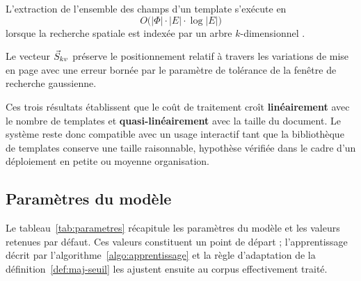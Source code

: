\begin{theoreme}
\label{th:complexite-extraction}
L'extraction de l'ensemble des champs d'un template s'exécute en
\begin{equation}
O\big(|\Phi| \cdot |E| \cdot \log |E|\big)
\end{equation}
lorsque la recherche spatiale est indexée par un arbre $k$-dimensionnel
\cite{bentley1975kdtree}.
\end{theoreme}

\begin{lemme}
\label{lem:preservation}
Le vecteur $\vec{S}_{kv}$ préserve le positionnement relatif à travers les variations de mise en
page avec une erreur bornée par le paramètre de tolérance de la fenêtre de recherche
gaussienne.
\end{lemme}

Ces trois résultats établissent que le coût de traitement croît \textbf{linéairement} avec le
nombre de templates et \textbf{quasi-linéairement} avec la taille du document. Le système
reste donc compatible avec un usage interactif tant que la bibliothèque de templates conserve
une taille raisonnable, hypothèse vérifiée dans le cadre d'un déploiement en petite ou
moyenne organisation.

\subsection{Paramètres du modèle}
\label{subsec:parametres}

Le tableau~\ref{tab:parametres} récapitule les paramètres du modèle et les valeurs retenues
par défaut. Ces valeurs constituent un point de départ ; l'apprentissage décrit par
l'algorithme~\ref{algo:apprentissage} et la règle d'adaptation de la
définition~\ref{def:maj-seuil} les ajustent ensuite au corpus effectivement traité.

